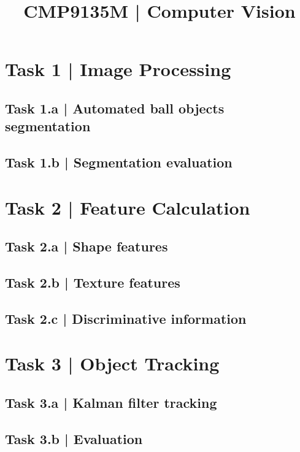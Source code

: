 \documentclass[conference]{IEEEtran}
\begin{document}
\title{CMP9135M | Computer Vision}

\author{
}

\maketitle

\begin{abstract}
\end{abstract}

\begin{IEEEkeywords}
\end{IEEEkeywords}

\section*{Task 1 | Image Processing}

\subsection*{Task 1.a | Automated ball objects segmentation}

\subsection*{Task 1.b | Segmentation evaluation}

\section*{Task 2 | Feature Calculation}

\subsection*{Task 2.a | Shape features}

\subsection*{Task 2.b | Texture features}

\subsection*{Task 2.c | Discriminative information}

\section*{Task 3 | Object Tracking}

\subsection*{Task 3.a | Kalman filter tracking}

\subsection*{Task 3.b | Evaluation}
\end{document}
